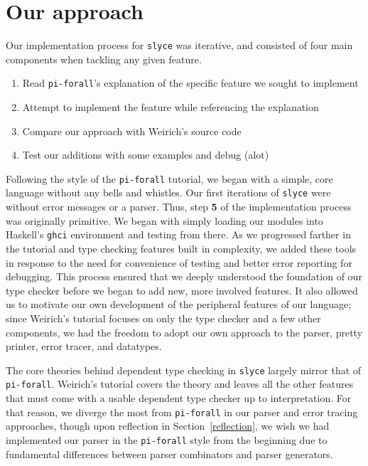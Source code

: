 \section{Our approach}
Our implementation process for \texttt{slyce} was iterative, and consisted of four main components when tackling any given feature.
\begin{enumerate}
    \item Read \texttt{pi-forall}'s explanation of the specific feature we sought to implement
    \item Attempt to implement the feature while referencing the explanation
    \item Compare our approach with Weirich's source code
    \item Test our additions with some examples and debug (alot)
\end{enumerate}

Following the style of the \texttt{pi-forall} tutorial, we began with a simple, core language without any bells and whistles.
Our first iterations of \texttt{slyce} were without error messages or a parser.
Thus, step \textbf{5} of the implementation process was originally primitive. 
We began with simply loading our modules into Haskell's \texttt{ghci} environment and testing from there.
As we progressed farther in the tutorial and type checking features built in
complexity, we added these tools in response to the need for convenience of
testing and
better error reporting for debugging.
This process ensured that we deeply understood the foundation of our type checker before we began to add new, more involved features. 
It also allowed us to motivate our own development of the peripheral features
of our language; since Weirich's tutorial focuses on only the type checker and
a few other components, we had the freedom to adopt our own approach to the
parser, pretty printer, error tracer, and datatypes.

The core theories behind dependent type checking in \texttt{slyce} largely mirror that of \texttt{pi-forall}.
Weirich's tutorial covers the theory and leaves all the other features that
must come with a usable dependent type checker up to interpretation.
For that reason, we diverge the most from \texttt{pi-forall} in our parser and
error tracing approaches, though upon reflection in Section~\ref{reflection},
we wish we had implemented our parser in the \texttt{pi-forall} style from the
beginning due to fundamental differences between parser combinators and parser
generators.
